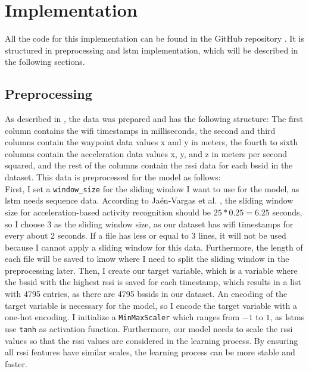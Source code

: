 \chapter{Implementation}\label{ch:implementation}

All the code for this implementation can be found in the GitHub repository \cite{github-repo}.
It is structured in preprocessing and \ac{lstm} implementation, which will be described in the following sections.

\section{Preprocessing}
As described in , the data was prepared and has the following structure:
The first column contains the \ac{wifi} timestamps in milliseconds, the second and third columns contain the waypoint data values x and y in meters, the fourth to sixth columns contain the acceleration data values x, y, and z in meters per second squared, and the rest of the columns contain the \ac{rssi} data for each \ac{bssid} in the dataset.
This data is preprocessed for the model as follows:\\
First, I set a \texttt{window\_size} for the sliding window I want to use for the model, as \ac{lstm} needs sequence data.
According to Ja{\'e}n-Vargas et al. \cite{EffectsSlidingWindow2022}, the sliding window size for acceleration-based activity recognition should be \(25 * 0.25 = 6.25\) seconds, so I choose \(3\) as the sliding window size, as our dataset has \ac{wifi} timestamps for every about 2 seconds.
If a file has less or equal to \(3\) lines, it will not be used because I cannot apply a sliding window for this data.
Furthermore, the length of each file will be saved to know where I need to split the sliding window in the preprocessing later.
Then, I create our target variable, which is a variable where the \ac{bssid} with the highest \ac{rssi} is saved for each timestamp, which results in a list with 4795 entries, as there are 4795 \acp{bssid} in our dataset.
An encoding of the target variable is necessary for the model, so I encode the target variable with a one-hot encoding.
I initialize a \texttt{MinMaxScaler} which ranges from \(-1\) to \(1\), as \acp{lstm} use \texttt{tanh} as activation function. 
Furthermore, our model needs to scale the \ac{rssi} values so that the \ac{rssi} values are considered in the learning process.
By ensuring all \ac{rssi} features have similar scales, the learning process can be more stable and faster. 

